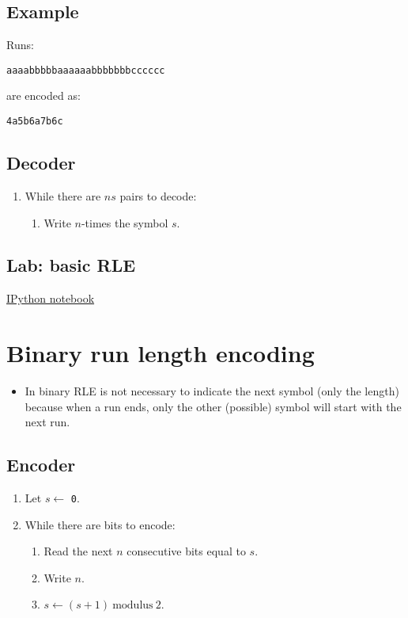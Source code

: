 \subsection{Example}

Runs:

\begin{verbatim}
aaaabbbbbaaaaaabbbbbbbcccccc
\end{verbatim}

are encoded as:

\begin{verbatim}
4a5b6a7b6c
\end{verbatim}

\subsection{Decoder}

\begin{enumerate}
  \tightlist
\item While there are \(ns\) pairs to decode:
  \tightlist
  \begin{enumerate}
    \tightlist
  \item Write \(n\)-times the symbol \(s\).
  \end{enumerate}
\end{enumerate}

\subsection{Lab: basic RLE}
\href{https://nbviewer.jupyter.org/github/vicente-gonzalez-ruiz/Run-length_encoding/blob/master/RLE.ipynb}{IPython notebook}

\section{Binary run length encoding}

\begin{itemize}
  \tightlist
\item In binary RLE is not necessary to indicate the next symbol (only the
  length) because when a run ends, only the other (possible) symbol will
  start with the next run.
\end{itemize}

\subsection{Encoder}

\begin{enumerate}
\tightlist
\item
  Let \(s\leftarrow\) \texttt{0}.
\item
  While there are bits to encode:
  \tightlist
  \begin{enumerate}
  \tightlist
  \item
    Read the next \(n\) consecutive bits equal to \(s\).
  \item
    Write \(n\).
  \item
    \(s\leftarrow (s+1)~\text{modulus}~2\).
  \end{enumerate}
\end{enumerate}

